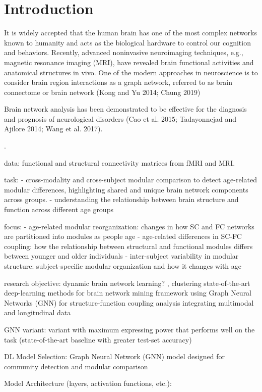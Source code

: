 
\section{Introduction}
It is widely accepted that the human brain has one of the
most complex networks known to humanity and acts as the
biological hardware to control our cognition and behaviors.
Recently, advanced noninvasive neuroimaging techniques,
e.g., magnetic resonance imaging (MRI), have revealed
brain functional activities and anatomical structures in
vivo. One of the modern approaches in neuroscience is
to consider brain region interactions as a graph network,
referred to as brain connectome or brain network (Kong and
Yu 2014; Chung 2019) 

Brain network analysis has been
demonstrated to be effective for the diagnosis and prognosis
of neurological disorders (Cao et al. 2015; Tadayonnejad
and Ajilore 2014; Wang et al. 2017).



\cite{Zhang2022}.


data: functional and structural connectivity matrices from fMRI and MRI. 

task: 
- cross-modality and cross-subject modular comparison 
to detect age-related modular differences, highlighting shared 
and unique brain network components across groups. 
-  understanding the relationship between brain structure and function 
across different age groups

focus: 
- age-related modular reorganization: changes in how SC and FC networks are partitioned 
    into modules as people age
- age-related differences in SC-FC coupling: how the relationship between structural and 
    functional modules differs between younger and older individuals
- inter-subject variability in modular structure: subject-specific modular organization 
    and how it changes with age
\cite{Puxeddu2022}

research objective: 
dynamic brain network learning? \cite{Tang2023}, 
clustering
state-of-the-art deep-learning methods for brain network mining
framework using Graph Neural Networks (GNN) for structure-function coupling analysis
integrating multimodal and longitudinal data \cite{Luo2024} \cite{Zhang2022}


GNN variant: variant with maximum expressing power that performs
well on the task (state-of-the-art baseline with greater test-set
accuracy)

DL Model Selection: Graph Neural Network (GNN) model designed for 
community detection and modular comparison

Model Architecture (layers, activation functions, etc.):



